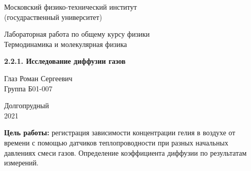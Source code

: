 \documentclass[a4paper, 12pt]{article} %
\begin{document}


\begin{titlepage}

    \newpage
    \begin{center}
        \normalsize Московский физико-технический институт \\(госудраственный университет)
    \end{center}

    \vspace{6em}

    \begin{center}
        \Large Лабораторная работа по общему курсу физики\\Термодинамика и молекулярная физика
    \end{center}

    \vspace{1em}

    \begin{center}
        \Large \textbf{2.2.1. Исследование диффузии газов}
    \end{center}

    \vspace{2em}

    \begin{center}
        \large Глаз Роман Сергеевич\\
        Группа Б01-007
    \end{center}

    \vspace{\fill}

    \begin{center}
        Долгопрудный \\2021
    \end{center}
    
\end{titlepage}



    \thispagestyle{empty}
    \newpage
    \tableofcontents
    \newpage
    \setcounter{page}{1}



\textbf{Цель работы:} регистрация зависимости концентрации гелия в воздухе от времени с помощью датчиков теплопроводности при разных начальных давлениях смеси газов. Определение коэффициента диффузии по результатам измерений.\\
\end{document}
